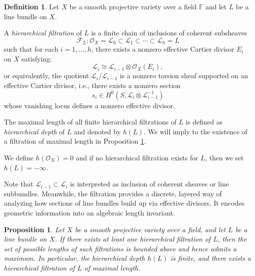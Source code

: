 \documentclass[14pt]{amsart}
\theoremstyle{plain}
\newtheorem{prop}[thm]{\bf Proposition}
\theoremstyle{definition}
\newtheorem{defn}[thm]{\bf Definition}
\theoremstyle{remark}
\theoremstyle{example}
\def \F{\mathbb{F}}
\def \L{\mathcal{L}}
\def \O{\mathcal{O}}
\def \FF{\mathcal{F}}
\begin{document}
\begin{defn}\label{Def:hierar}
Let $X$ be a smooth projective variety over a field $\F$ and let $L$ be a line bundle on $X$.

A \emph{hierarchical filtration} of $L$ is a finite chain of inclusions of coherent subsheaves
$$\FF_L:\O_X = \L_0 \subset \L_1 \subset \cdots \subset \L_h = L$$
such that for each $i=1,\dots,h$, there exists a nonzero effective Cartier divisor $E_i$ on $X$ satisfying:
$$\L_i\cong\L_{i-1}\otimes\O_X(E_i),$$
or equivalently, the quotient $\L_i / \L_{i-1}$ is a nonzero torsion sheaf supported on an effective Cartier divisor, i.e., there exists a nonzero section
$$s_i\in H^0(S,\L_i\otimes\L^{-1}_{i-1})$$
whose vanishing locus defines a nonzero effective divisor.

The maximal length of all finite hierarchical filtrations of $L$ is defined as \textit{hierarchical depth} of $L$ and denoted by $h(L)$. We will imply to the existence of a filtration of maximal length in Proposition \ref{prop:max-filtration}.

We define $h(\O_X)=0$ and if no hierarchical filtration exists for $L$, then we set $h(L)=-\infty$.
\end{defn}

Note that $\L_{i-1}\subset\L_i$ is interpreted as inclusion of coherent sheaves or line subbundles. Meanwhile, the filtration provides a discrete, layered way of analyzing how sections of line bundles build up via effective divisors. It encodes geometric information into an algebraic length invariant.

\begin{prop}\label{prop:max-filtration}
Let $X$ be a smooth projective variety over a field, and let $L$ be a line bundle on $X$.
If there exists at least one hierarchical filtration of $L$, then the set of possible
lengths of such filtrations is bounded above and hence admits a maximum. 
In particular, the hierarchical depth $h(L)$ is finite, and there exists a hierarchical
filtration of $L$ of maximal length.
\end{prop}
\end{document}
